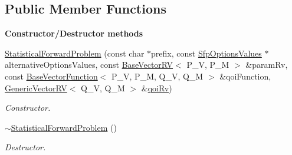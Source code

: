 \subsection*{Public Member Functions}
\begin{Indent}{\bf Constructor/\-Destructor methods}\par
\begin{DoxyCompactItemize}
\item 
\hyperlink{class_q_u_e_s_o_1_1_statistical_forward_problem_ab2aba79cca8d9fde437fa2bc7d196adc}{Statistical\-Forward\-Problem} (const char $\ast$prefix, const \hyperlink{class_q_u_e_s_o_1_1_sfp_options_values}{Sfp\-Options\-Values} $\ast$alternative\-Options\-Values, const \hyperlink{class_q_u_e_s_o_1_1_base_vector_r_v}{Base\-Vector\-R\-V}$<$ P\-\_\-\-V, P\-\_\-\-M $>$ \&param\-Rv, const \hyperlink{class_q_u_e_s_o_1_1_base_vector_function}{Base\-Vector\-Function}$<$ P\-\_\-\-V, P\-\_\-\-M, Q\-\_\-\-V, Q\-\_\-\-M $>$ \&qoi\-Function, \hyperlink{class_q_u_e_s_o_1_1_generic_vector_r_v}{Generic\-Vector\-R\-V}$<$ Q\-\_\-\-V, Q\-\_\-\-M $>$ \&\hyperlink{class_q_u_e_s_o_1_1_statistical_forward_problem_ae2aa8a443bec68b57342c3afc079356d}{qoi\-Rv})
\begin{DoxyCompactList}\small\item\em Constructor. \end{DoxyCompactList}\item 
\hyperlink{class_q_u_e_s_o_1_1_statistical_forward_problem_add0e52e8c9a8f80cc0d4e401a3e958e4}{$\sim$\-Statistical\-Forward\-Problem} ()
\begin{DoxyCompactList}\small\item\em Destructor. \end{DoxyCompactList}\end{DoxyCompactItemize}
\end{Indent}
